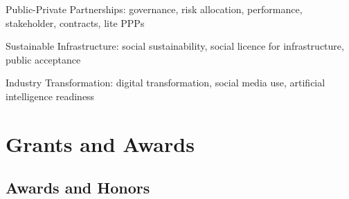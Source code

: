 \documentclass[11pt,a4paper]{report} %
\newcommand{\listitemspace}{0.25em}
\renewenvironment{itemize}
{\begin{list}{}{\setlength{\leftmargin}{0em}
                \setlength{\parskip}{0em}
                \setlength{\itemsep}{\listitemspace}
                \setlength{\parsep}{\listitemspace}}}
{\end{list}}
\begin{document}
    \begin{itemize}

        \item Public-Private Partnerships: governance, risk allocation, performance, stakeholder, contracts, lite PPPs
        
        \item Sustainable Infrastructure: social sustainability, social licence for infrastructure, public acceptance
        
        \item Industry Transformation: digital transformation, social media use, artificial intelligence readiness

    \end{itemize}



    \section*{Grants and Awards}

    \subsection*{Awards and Honors}
\end{document}
